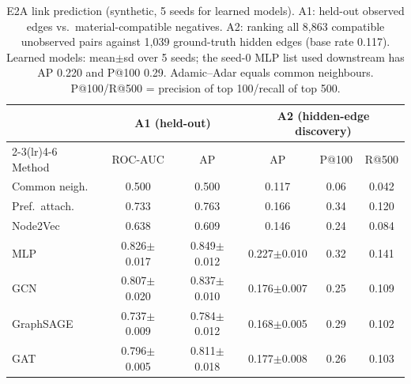 \begin{table}[t]\centering\caption{E2A link prediction (synthetic, 5 seeds for learned models). A1: held-out observed edges vs.\ material-compatible negatives. A2: ranking all 8,863 compatible unobserved pairs against 1,039 ground-truth hidden edges (base rate 0.117). Learned models: mean$\pm$sd over 5 seeds; the seed-0 MLP list used downstream has AP 0.220 and P@100 0.29. Adamic--Adar equals common neighbours. P@100/R@500 = precision of top 100/recall of top 500.}\label{tab:exp2a}\scriptsize\setlength{\tabcolsep}{2.6pt}\begin{tabular}{lccccc}\toprule
 & \multicolumn{2}{c}{A1 (held-out)} & \multicolumn{3}{c}{A2 (hidden-edge discovery)}\\\cmidrule(lr){2-3}\cmidrule(lr){4-6}
Method & ROC-AUC & AP & AP & P@100 & R@500\\\midrule
Common neigh. & 0.500 & 0.500 & 0.117 & 0.06 & 0.042 \\
Pref.~attach. & 0.733 & 0.763 & 0.166 & 0.34 & 0.120 \\
Node2Vec & 0.638 & 0.609 & 0.146 & 0.24 & 0.084 \\
MLP & 0.826$\pm$0.017 & 0.849$\pm$0.012 & 0.227$\pm$0.010 & 0.32 & 0.141 \\
GCN & 0.807$\pm$0.020 & 0.837$\pm$0.010 & 0.176$\pm$0.007 & 0.25 & 0.109 \\
GraphSAGE & 0.737$\pm$0.009 & 0.784$\pm$0.012 & 0.168$\pm$0.005 & 0.29 & 0.102 \\
GAT & 0.796$\pm$0.005 & 0.811$\pm$0.018 & 0.177$\pm$0.008 & 0.26 & 0.103 \\
\bottomrule\end{tabular}\end{table}